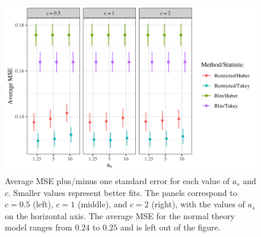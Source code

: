 \documentclass[ba]{imsart}
\begin{document}
 
\begin{figure}[t]
\centering
\includegraphics[width = 5in]{mse_sim2_facet_scale.png}
\caption{Average MSE plus/minus one standard error for each value of $a_{s}$ and $c$. Smaller values represent better fits. The panels correspond to $c = 0.5$ (left), $c=1$ (middle), and $c=2$ (right), with the values of $a_{s}$ on the horizontal axis. The average MSE for the normal theory model ranges from $0.24$ to $0.25$ and is left out of the figure.}
\label{mse_sim}
\end{figure}
\end{document}
